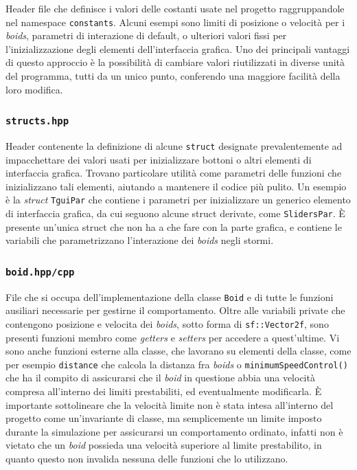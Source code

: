 \documentclass[10pt,a4paper]{article}
\begin{document}
Header file che definisce i valori delle costanti usate nel progetto raggruppandole nel namespace \texttt{constants}. Alcuni esempi sono limiti di posizione o velocità per i \textit{boids}, parametri di interazione di default, o ulteriori valori fissi per l'inizializzazione degli elementi dell'interfaccia grafica. Uno dei principali vantaggi di questo approccio è la possibilità di cambiare valori riutilizzati in diverse unità del programma, tutti da un unico punto, conferendo una maggiore facilità della loro modifica.

\subsubsection{\texttt{structs.hpp}}

Header contenente la definizione di alcune \texttt{struct} designate prevalentemente ad impacchettare dei valori usati per inizializzare bottoni o altri elementi di interfaccia grafica. Trovano particolare utilità come parametri delle funzioni che inizializzano tali elementi, aiutando a mantenere il codice più pulito. Un esempio è la \textit{struct} \texttt{TguiPar} che contiene i parametri per inizializzare un generico elemento di interfaccia grafica, da cui seguono alcune struct derivate, come \texttt{SlidersPar}. È presente un'unica struct che non ha a che fare con la parte grafica, e contiene le variabili che parametrizzano l'interazione dei \textit{boids} negli stormi.

\subsubsection{\texttt{boid.hpp/cpp}}

File che si occupa dell'implementazione della classe \texttt{Boid} e di tutte le funzioni ausiliari necessarie per gestirne il comportamento. Oltre alle variabili private che contengono posizione e velocita dei \textit{boids}, sotto forma di \texttt{sf::Vector2f}, sono presenti funzioni membro come \textit{getters} e \textit{setters} per accedere a quest'ultime. Vi sono anche funzioni esterne alla classe, che lavorano su elementi della classe, come per esempio \texttt{distance} che calcola la distanza fra \textit{boids} o \texttt{minimumSpeedControl()} che ha il compito di assicurarsi che il \textit{boid} in questione abbia una velocità compresa all'interno dei limiti prestabiliti, ed eventualmente modificarla. È importante sottolineare che la velocità limite non è stata intesa all'interno del progetto come un'invariante di classe, ma semplicemente un limite imposto durante la simulazione per assicurarsi un comportamento ordinato, infatti non è vietato che un \textit{boid} possieda una velocità superiore al limite prestabilito, in quanto questo non invalida nessuna delle funzioni che lo utilizzano.
\end{document}

